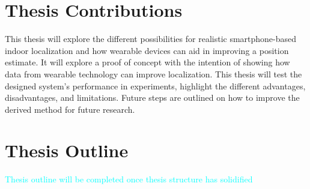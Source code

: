 \section{Thesis Contributions}
This thesis will explore the different possibilities for realistic smartphone-based indoor localization and how wearable devices can aid in improving a position estimate. It will explore a proof of concept with the intention of showing how data from wearable technology can improve localization. This thesis will test the designed system's performance in experiments, highlight the different advantages, disadvantages, and limitations. Future steps are outlined on how to improve the derived method for future research.

\section{Thesis Outline}
\textcolor{cyan}{Thesis outline will be completed once thesis structure has solidified}